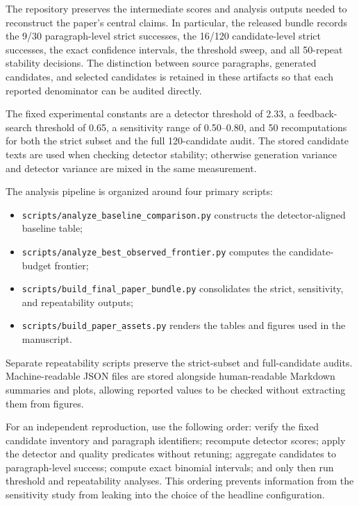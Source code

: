 The repository preserves the intermediate scores and analysis outputs needed to reconstruct the paper's central claims. In particular, the released bundle records the 9/30 paragraph-level strict successes, the 16/120 candidate-level strict successes, the exact confidence intervals, the threshold sweep, and all 50-repeat stability decisions. The distinction between source paragraphs, generated candidates, and selected candidates is retained in these artifacts so that each reported denominator can be audited directly.

The fixed experimental constants are a detector threshold of 2.33, a feedback-search threshold of 0.65, a sensitivity range of 0.50--0.80, and 50 recomputations for both the strict subset and the full 120-candidate audit. The stored candidate texts are used when checking detector stability; otherwise generation variance and detector variance are mixed in the same measurement.

The analysis pipeline is organized around four primary scripts:
\begin{itemize}[leftmargin=*]
  \item \texttt{scripts/analyze\_baseline\_comparison.py} constructs the detector-aligned baseline table;
  \item \texttt{scripts/analyze\_best\_observed\_frontier.py} computes the candidate-budget frontier;
  \item \texttt{scripts/build\_final\_paper\_bundle.py} consolidates the strict, sensitivity, and repeatability outputs;
  \item \texttt{scripts/build\_paper\_assets.py} renders the tables and figures used in the manuscript.
\end{itemize}
Separate repeatability scripts preserve the strict-subset and full-candidate audits. Machine-readable JSON files are stored alongside human-readable Markdown summaries and plots, allowing reported values to be checked without extracting them from figures.

For an independent reproduction, use the following order: verify the fixed candidate inventory and paragraph identifiers; recompute detector scores; apply the detector and quality predicates without retuning; aggregate candidates to paragraph-level success; compute exact binomial intervals; and only then run threshold and repeatability analyses. This ordering prevents information from the sensitivity study from leaking into the choice of the headline configuration.
